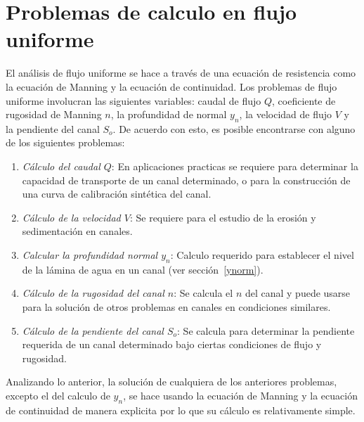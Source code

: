 \documentclass[11pt, oneside]{article}
\begin{document}
\section{Problemas de calculo en flujo uniforme} %
El análisis de flujo uniforme se hace a trav\'es de una ecuación de resistencia como la ecuaci\'on de Manning y la ecuación de continuidad. Los problemas de flujo uniforme involucran las siguientes variables: caudal de flujo $Q$, coeficiente de rugosidad de Manning $n$, la profundidad de normal $y_n$, la velocidad de flujo $V$ y la pendiente del canal $S_o$. De acuerdo con esto, es posible encontrarse con alguno de los siguientes problemas:
\begin{enumerate}
\item \emph{C\'alculo del caudal $Q$}: En aplicaciones practicas se requiere para determinar la capacidad de transporte de un canal determinado, o para la construcci\'on de una curva de calibración sintética del canal.  
\item \emph{C\'alculo de la velocidad $V$}: Se requiere para el estudio de la erosión y sedimentaci\'on en canales. 
\item \emph{Calcular la profundidad normal $y_n$}: Calculo requerido para establecer el nivel de la l\'amina de agua en un canal (ver secci\'on~\ref{ynorm}).
\item \emph{C\'alculo de la rugosidad del canal $n$}: Se calcula el $n$ del canal y puede usarse para la soluci\'on de otros problemas en canales en condiciones similares. 
\item \emph{C\'alculo de la pendiente del canal $S_o$}: Se calcula para determinar la pendiente requerida de un canal determinado bajo ciertas condiciones de flujo y rugosidad. 
\end{enumerate}
Analizando lo anterior, la soluci\'on de cualquiera de los anteriores problemas, excepto el del calculo de $y_n$, se hace usando la ecuación de Manning y la ecuación de continuidad de manera explicita por lo que su c\'alculo es relativamente simple.


\end{document}
